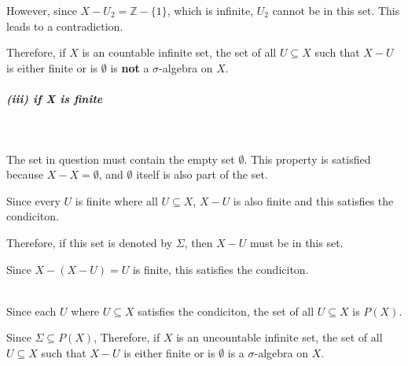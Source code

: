 \documentclass[12pt]{article}
\begin{document}
\par \hspace*{1em}However, since \( X - U_2 = \mathbb{Z} - \{1\} \), which is infinite, \( U_2 \) cannot be in this set. This leads to a contradiction.\\

\par \hspace*{1em}Therefore, if \( X \) is an countable infinite set, the set of all \( U \subseteq X \) such that \( X - U \) is either finite or is \(\emptyset\) is \textbf{not}  a \( \sigma \)-algebra on \( X \).\\

\subparagraph{(iii) if X is finite}
\ \\
\par \hspace*{1em}The set in question must contain the empty set \( \emptyset \). This property is satisfied because \( X - X = \emptyset \), and \( \emptyset \) itself is also part of the set. \\
\par \hspace*{1em}Since every \(U\) is finite where all \( U \subseteq X \), \(X-U\) is also finite and this satisfies the condiciton. \\
\par \hspace*{1em}Therefore, if this set is denoted by \( \Sigma \), then \( X-U \) must be in this set. \\
\par \hspace*{1em}Since \( X - (X-U) = U\) is finite, this satisfies the condiciton. \\ \\

\par \hspace*{1em}Since each \( U \) where \( U \subseteq X \) satisfies the condiciton, the set of all \( U \subseteq X \) is \( P(X) \). \\
\par \hspace*{1em}Since \( \Sigma \subseteq P(X) \), Therefore, if \( X \) is an uncountable infinite set, the set of all \( U \subseteq X \) such that \( X - U \) is either finite or is \(\emptyset\) is a \( \sigma \)-algebra on \( X \).
\end{document}
